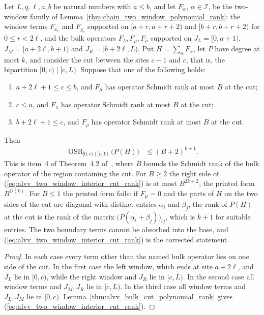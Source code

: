 \begin{lemma}
    \label{thm:alvv_two_window_interior_cut_rank}
    \leanok
    Let $L,q,\ell,a,b$ be natural numbers with $a\le b$, and let $F_\alpha$,
    $\alpha\in\mathcal I$, be the two-window family of
    Lemma~\ref{thm:chain_two_window_polynomial_rank}: the window terms
    $F_{x_r}$ and $F_{y_r}$ supported on $[a+r,a+r+2)$ and $[b+r,b+r+2)$
    for $0\le r<2\ell$, and the bulk operators $F_\lambda,F_\mu,F_\rho$
    supported on $J_L=[0,a+1)$, $J_M=[a+2\ell,b+1)$ and
    $J_R=[b+2\ell,L)$. Put $H=\sum_\alpha F_\alpha$, let $P$ have degree at
    most $k$, and consider the cut between the sites $c-1$ and $c$, that is,
    the bipartition $[0,c)\mid[c,L)$. Suppose that one of the following holds:
    \begin{enumerate}
        \item $a+2\ell+1\le c\le b$, and $F_\mu$ has operator Schmidt rank at
              most $B$ at the cut;
        \item $c\le a$, and $F_\lambda$ has operator Schmidt rank at most $B$
              at the cut;
        \item $b+2\ell+1\le c$, and $F_\rho$ has operator Schmidt rank at
              most $B$ at the cut.
    \end{enumerate}
    Then
    \begin{align}
        \operatorname{OSR}_{[0,c)\mid[c,L)}\bigl(P(H)\bigr)
         & \le(B+2)^{k+1}.
        \label{eq:alvv_two_window_interior_cut_rank}
    \end{align}
    This is item~4 of Theorem~4.2 of~\cite{Arad2016RigorousRG}, where $B$
    bounds the Schmidt rank of the bulk operator of the region containing
    the cut. For $B\ge2$ the right side of
    (\ref{eq:alvv_two_window_interior_cut_rank}) is at most $B^{2k+2}$,
    the printed form $B^{O(k)}$. For $B\le1$ the printed form fails: if
    $F_\mu=0$ and the parts of $H$ on the two sides of the cut are diagonal
    with distinct entries $\alpha_i$ and $\beta_j$, the rank of $P(H)$ at the
    cut is the rank of the matrix $\bigl(P(\alpha_i+\beta_j)\bigr)_{ij}$,
    which is $k+1$ for suitable entries. The two boundary terms cannot be
    absorbed into the base, and
    (\ref{eq:alvv_two_window_interior_cut_rank}) is the corrected statement.
\end{lemma}
\begin{proof}\leanok
    In each case every term other than the named bulk operator lies on one
    side of the cut. In the first case the left window, which ends at site
    $a+2\ell$, and $J_L$ lie in $[0,c)$, while the right window and $J_R$ lie
    in $[c,L)$. In the second case all window terms and $J_M,J_R$ lie in
    $[c,L)$. In the third case all window terms and $J_L,J_M$ lie in $[0,c)$.
    Lemma~\ref{thm:alvv_bulk_cut_polynomial_rank} gives
    (\ref{eq:alvv_two_window_interior_cut_rank}).
\end{proof}


